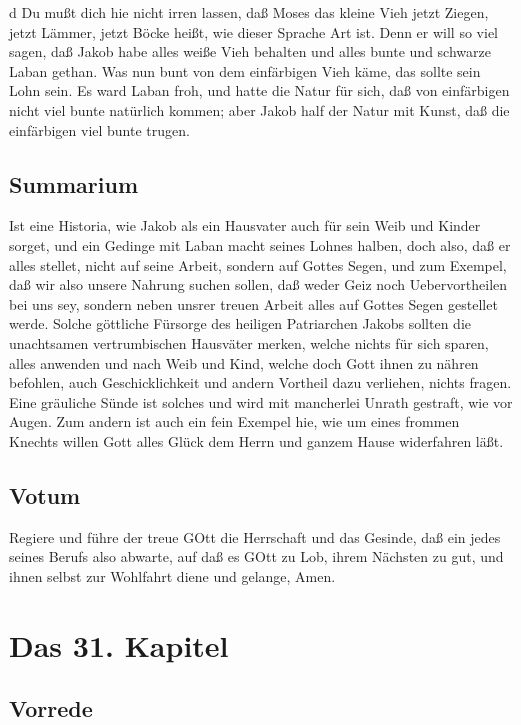 d Du mußt dich hie nicht irren lassen, daß Moses das kleine Vieh jetzt Ziegen, jetzt Lämmer, jetzt Böcke heißt, wie dieser Sprache Art ist. Denn er will so viel sagen, daß Jakob habe alles weiße Vieh behalten und alles bunte und schwarze Laban gethan. Was nun bunt von dem einfärbigen Vieh käme, das sollte sein Lohn sein. Es ward Laban froh, und hatte die Natur für sich, daß von einfärbigen nicht viel bunte natürlich kommen; aber Jakob half der Natur mit Kunst, daß die einfärbigen viel bunte trugen.

\section{Summarium}

Ist eine Historia, wie Jakob als ein Hausvater auch für sein Weib und Kinder sorget, und ein Gedinge mit Laban macht seines Lohnes halben, doch also, daß er alles stellet, nicht auf seine Arbeit, sondern auf Gottes Segen, und zum Exempel, daß wir also unsere Nahrung suchen sollen, daß weder Geiz noch Uebervortheilen bei uns sey, sondern neben unsrer treuen Arbeit alles auf Gottes Segen gestellet werde. Solche göttliche Fürsorge des heiligen Patriarchen Jakobs sollten die unachtsamen vertrumbischen Hausväter merken, welche nichts für sich sparen, alles anwenden und nach Weib und Kind, welche doch Gott ihnen zu nähren befohlen, auch Geschicklichkeit und andern Vortheil dazu verliehen, nichts fragen. Eine gräuliche Sünde ist solches und wird mit mancherlei Unrath gestraft, wie vor Augen.
Zum andern ist auch ein fein Exempel hie, wie um eines frommen Knechts willen Gott alles Glück dem Herrn und ganzem Hause widerfahren läßt.

\section{Votum}

Regiere und führe der treue GOtt die Herrschaft und das Gesinde, daß ein jedes seines Berufs also abwarte, auf daß es GOtt zu Lob, ihrem Nächsten zu gut, und ihnen selbst zur Wohlfahrt diene und gelange, Amen.

\chapter{Das 31. Kapitel}

\section{Vorrede}

